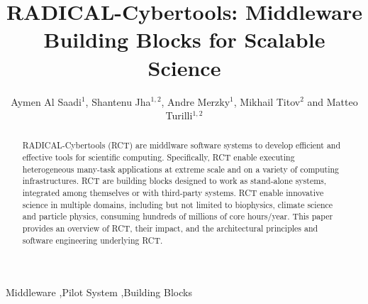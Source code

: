 \documentclass[preprint,12pt, a4paper]{elsarticle}
\begin{document}
\begin{frontmatter}

\title{RADICAL-Cybertools: Middleware Building Blocks for Scalable Science}

\author{Aymen Al Saadi$^1$, Shantenu Jha$^{1,2}$, Andre Merzky$^1$, Mikhail Titov$^2$ and Matteo Turilli$^{1,2}$}
\address{$^1$Electrical \& Computer Engineering, Rutgers University, Piscataway, NJ 08854, USA, $^2$Brookhaven National Laboratory}

\begin{abstract}
RADICAL-Cybertools (RCT) are middlware software systems to develop efficient and
effective tools for scientific computing. Specifically, RCT enable executing
heterogeneous many-task applications at extreme scale and on a variety of
computing infrastructures. RCT are building blocks designed to work as
stand-alone systems, integrated among themselves or with third-party systems.
RCT enable innovative science in multiple domains, including but not limited to
biophysics, climate science and particle physics, consuming hundreds of millions
of core hours/year. This paper provides an overview of RCT, their impact, and
the architectural principles and software engineering underlying RCT\@.
\end{abstract}

\begin{keyword}

Middleware \sep Pilot System \sep Building Blocks



\end{keyword}

\end{frontmatter}


\end{document}
